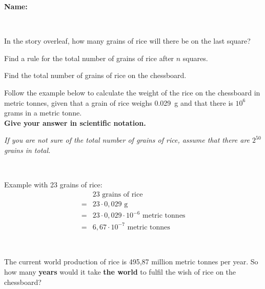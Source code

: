 \documentclass[8pt]{exam}
\begin{document}
\textbf{Name:} \dotfill

\

\begin{questions}

\question[1] In the story overleaf, how many grains of rice will there be on the last square? 
\fillwithdottedlines{7mm}

\question[3] Find a rule for the total number of grains of rice after $n$ squares.
\fillwithdottedlines{50mm}

\question[1] Find the total number of grains of rice on the chessboard.
\fillwithdottedlines{7mm}

\question[2] Follow the example below to calculate the weight of the rice on the chessboard in metric tonnes, given that a grain of rice weighs \SI{0,029}{g} and that there is $10^6$ grams in a metric tonne. \\
\textbf{Give your answer in scientific notation.}

\emph{If you are not sure of the total number of grains of rice, assume that there are $2^{50}$ grains in total.}

\

\begin{minipage}[c]{0.3\textwidth}
Example with 23 grains of rice:
\begin{align*}
&\mbox{23 grains of rice} \\
=& 23 \cdot 0,029 \,\, \mbox{g} \\
=& 23 \cdot 0,029 \cdot 10^{-6} \,\, \mbox{metric tonnes} \\
=& 6,67 \cdot 10^{-7} \,\, \mbox{metric tonnes}
\end{align*}

\end{minipage}
\vline
\hspace{2mm}
\begin{minipage}[c]{0.6\textwidth}
\vspace{-3mm}
\fillwithdottedlines{39mm}
\end{minipage}

\

\question[1] The current world production of rice is 495,87 million metric tonnes per year. So how many \textbf{years} would it take \textbf{the world} to fulfil the wish of rice on the chessboard?
\fillwithdottedlines{35mm}


\end{questions}




\vfill
\end{document}
